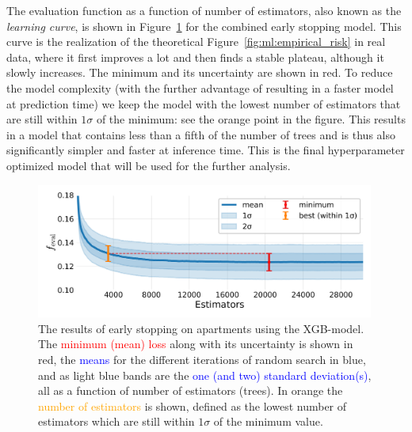 The evaluation function as a function of number of estimators, also known as the \emph{learning curve}, is shown in Figure~\ref{fig:h:CV_res_ES_learning_curve_ejer} for the combined early stopping model. This curve is the realization of the theoretical Figure~\ref{fig:ml:empirical_risk} in real data, where it first improves a lot and then finds a stable plateau, although it slowly increases. The minimum and its uncertainty are shown in red. To reduce the model complexity (with the further advantage of resulting in a faster model at prediction time) we keep the model with the lowest number of estimators that are still within $1\sigma$ of the minimum: see the orange point in the figure. This results in a model that contains less than a fifth of the number of trees and is thus also significantly simpler and faster at inference time. This is the final hyperparameter optimized model that will be used for the further analysis. 

\begin{figure}
  \centerfloat
  \includegraphics[draft=false, width=0.99\textwidth, trim=10 20 10 10, clip]{figures/housing/Ejerlejlighed_v19_cut_all_Ncols_all_xgb_early_stopping_fig.png}
  \caption[Early Stopping Results]
          {The results of early stopping on apartments using the XGB-model. The \textcolor{red}{minimum (mean) loss} along with its uncertainty is shown in red, the \textcolor{blue}{means} for the different iterations of random search in blue, and as light blue bands are the \textcolor{blue}{one (and two) standard deviation(s)}, all as a function of number of estimators (trees). In orange the \textcolor{orange}{ number of estimators} is shown, defined as the lowest number of estimators which are still within $1\sigma$ of the minimum value.} 
  \label{fig:h:CV_res_ES_learning_curve_ejer}
\end{figure}

